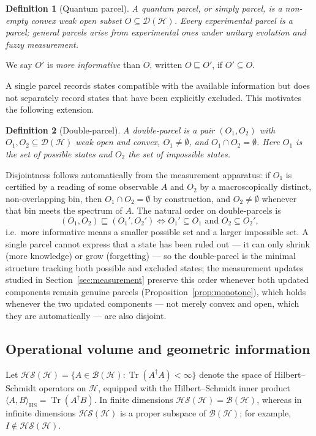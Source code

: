 \documentclass[11pt, onecolumn]{article}
\newtheorem{definition}{Definition}
\begin{document}
\begin{definition}[Quantum parcel]
\label{def:single-parcel}
A \emph{quantum parcel}, or simply \emph{parcel}, is a non-empty convex weak open subset $O\subseteq\mathcal D(\mathcal H)$. Every experimental parcel is a parcel; general parcels arise from experimental ones under unitary evolution and fuzzy measurement.
\end{definition}

We say $O'$ is \emph{more informative} than $O$, written $O\sqsubseteq O'$, if $O'\subseteq O$.

A single parcel records states compatible with the available information but does not separately record states that have been explicitly excluded. This motivates the following extension.

\begin{definition}[Double-parcel]
A \emph{double-parcel} is a pair $(O_1,O_2)$ with $O_1,O_2\subseteq\mathcal D(\mathcal H)$ weak open and convex, $O_1\neq\emptyset$, and $O_1\cap O_2=\emptyset$. Here $O_1$ is the set of \emph{possible} states and $O_2$ the set of \emph{impossible} states.
\end{definition}
Disjointness follows automatically from the measurement apparatus: if $O_1$ is certified by a reading of some observable $A$ and $O_2$ by a macroscopically distinct, non-overlapping bin, then $O_1\cap O_2=\emptyset$ by construction, and $O_2\neq\emptyset$ whenever that bin meets the spectrum of $A$. The natural order on double-parcels is
\[
(O_1,O_2)\sqsubseteq(O_1',O_2') \iff O_1'\subseteq O_1 \text{ and } O_2\subseteq O_2',
\]
i.e.\ more informative means a smaller possible set and a larger impossible set. A single parcel cannot express that a state has been ruled out — it can only shrink (more knowledge) or grow (forgetting) — so the double-parcel is the minimal structure tracking both possible and excluded states; the measurement updates studied in Section~\ref{sec:measurement} preserve this order whenever both updated components remain genuine parcels (Proposition~\ref{prop:monotone}), which holds whenever the two updated components — not merely convex and open, which they are automatically — are also disjoint.

\subsection{Operational volume and geometric information}

Let
$\mathcal{HS}(\mathcal H)
=
\{A\in\mathcal B(\mathcal H):
\operatorname{Tr}(A^\dagger A)<\infty\}$
denote the space of Hilbert--Schmidt operators on $\mathcal H$, equipped
with the Hilbert--Schmidt inner product
$\langle A,B\rangle_{\mathrm{HS}}
=\operatorname{Tr}(A^\dagger B)$.
In finite dimensions
$\mathcal{HS}(\mathcal H)=\mathcal B(\mathcal H)$, whereas in infinite
dimensions $\mathcal{HS}(\mathcal H)$ is a proper subspace of
$\mathcal B(\mathcal H)$; for example,
$I\notin\mathcal{HS}(\mathcal H)$.
\end{document}
